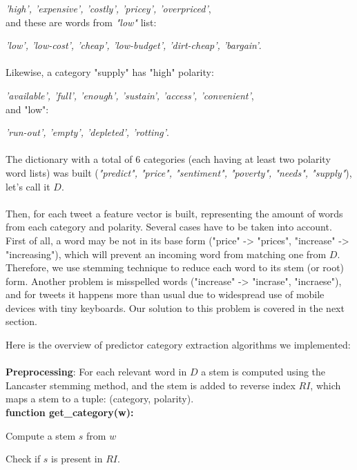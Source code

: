 \emph{'high', 'expensive', 'costly', 'pricey', 'overpriced'},
\\
and these are words from \emph{"low"} list:

\emph{'low', 'low-cost', 'cheap', 'low-budget', 'dirt-cheap', 'bargain'}.
\\ \\
Likewise, a category "supply" has "high" polarity:

\emph{'available', 'full', 'enough', 'sustain', 'access', 'convenient'},
\\
and "low":

\emph{'run-out', 'empty', 'depleted', 'rotting'}.
\\ \\
The dictionary with a total of 6 categories (each having at least two polarity word lists) was built (\emph{"predict", "price", "sentiment", "poverty", "needs", "supply"}), let's call it $D$.
\\ \\
Then, for each tweet a feature vector is built, representing the amount of words from each category and polarity. Several cases have to be taken into account. First of all, a word may be not in its base form ("price" -> "prices", "increase" -> "increasing"), which will prevent an incoming word from matching one from $D$. Therefore, we use stemming technique to reduce each word to its stem (or root) form. Another problem is misspelled words ("increase" -> "incrase", "incraese"), and for tweets it happens more than usual due to widespread use of mobile devices with tiny keyboards. Our solution to this problem is covered in the next section.

Here is the overview of predictor category extraction algorithms we implemented:\\ \\
\textbf{Preprocessing}: For each relevant word in $D$ a stem is computed using the Lancaster stemming method, and the stem is added to reverse index $RI$, which maps a stem to a tuple: (category, polarity). \\

\textbf{function get\_category(w):}

\indent
\begin{algorithm}[H]
Compute a stem $s$ from $w$ \par
Check if $s$ is present in $RI$.

\end{algorithm}
\noindent \\

